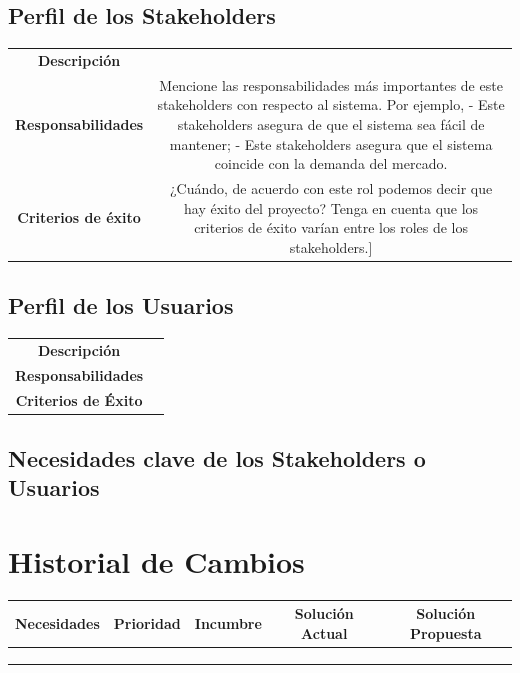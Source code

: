 \documentclass[11pt]{article}
\begin{document}
\subsection{Perfil de los Stakeholders}

\begin{table}[H]
	\centering
	\begin{tabular*}{0.75\textwidth}{c | c}
		\hline
		\textbf{Descripción} & \\ \textbf{Responsabilidades} & Mencione las responsabilidades más importantes de este stakeholders con respecto al sistema. Por ejemplo,
- Este stakeholders asegura de que el sistema sea fácil de mantener;
- Este stakeholders asegura que el sistema coincide con la demanda del mercado.\\ \textbf{Criterios de éxito} & ¿Cuándo, de acuerdo con este rol podemos decir que hay éxito del proyecto? Tenga en cuenta que los criterios de éxito varían entre los roles de los stakeholders.]\\
		\hline
	\end{tabular*}
\end{table}

\subsection{Perfil de los Usuarios}

\begin{table}[H]
	\centering
	\begin{tabular*}{0.75\textwidth}{c | c}
		\hline
		\textbf{Descripción} & \\ \textbf{Responsabilidades} & \\ \textbf{Criterios de Éxito} & \\
		\hline
	\end{tabular*}
\end{table}

\subsection{Necesidades clave de los Stakeholders o Usuarios}
\section{Historial de Cambios}
\begin{table}[H]
	\centering
	\begin{tabular*}{\textwidth}{c c c c c}
		\textbf{Necesidades} & \textbf{Prioridad} & \textbf{Incumbre} & \textbf{Solución Actual} & \textbf{Solución Propuesta} \\ \hline
		&  &  &  & \\ \hline
		&  &  &  & \\ \hline
		&  &  &  & \\ \hline
	\end{tabular*}
\end{table}
\end{document}
